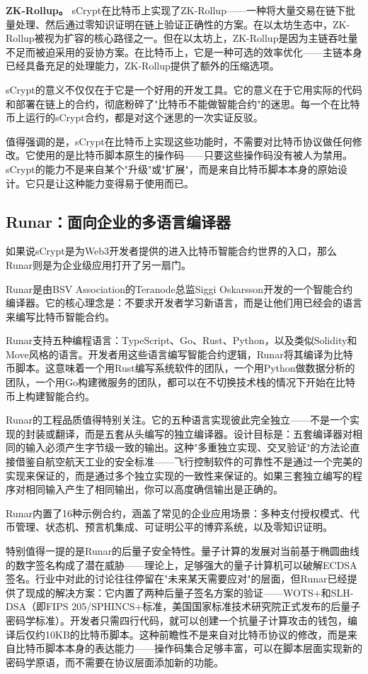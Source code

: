 \documentclass[a4paper,12pt,openany]{ctexbook}
\begin{document}
\textbf{ZK-Rollup。} sCrypt在比特币上实现了ZK-Rollup——一种将大量交易在链下批量处理、然后通过零知识证明在链上验证正确性的方案。在以太坊生态中，ZK-Rollup被视为扩容的核心路径之一。但在以太坊上，ZK-Rollup是因为主链吞吐量不足而被迫采用的妥协方案。在比特币上，它是一种可选的效率优化——主链本身已经具备充足的处理能力，ZK-Rollup提供了额外的压缩选项。

sCrypt的意义不仅仅在于它是一个好用的开发工具。它的意义在于它用实际的代码和部署在链上的合约，彻底粉碎了"比特币不能做智能合约"的迷思。每一个在比特币上运行的sCrypt合约，都是对这个迷思的一次实证反驳。

值得强调的是，sCrypt在比特币上实现这些功能时，不需要对比特币协议做任何修改。它使用的是比特币脚本原生的操作码——只要这些操作码没有被人为禁用。sCrypt的能力不是来自某个"升级"或"扩展"，而是来自比特币脚本本身的原始设计。它只是让这种能力变得易于使用而已。


\subsection*{Runar：面向企业的多语言编译器}


如果说sCrypt是为Web3开发者提供的进入比特币智能合约世界的入口，那么Runar则是为企业级应用打开了另一扇门。

Runar是由BSV Association的Teranode总监Siggi Oskarsson开发的一个智能合约编译器。它的核心理念是：不要求开发者学习新语言，而是让他们用已经会的语言来编写比特币智能合约。

Runar支持五种编程语言：TypeScript、Go、Rust、Python，以及类似Solidity和Move风格的语言。开发者用这些语言编写智能合约逻辑，Runar将其编译为比特币脚本。这意味着一个用Rust编写系统软件的团队，一个用Python做数据分析的团队，一个用Go构建微服务的团队，都可以在不切换技术栈的情况下开始在比特币上构建智能合约。

Runar的工程品质值得特别关注。它的五种语言实现彼此完全独立——不是一个实现的封装或翻译，而是五套从头编写的独立编译器。设计目标是：五套编译器对相同的输入必须产生字节级一致的输出。这种"多重独立实现、交叉验证"的方法论直接借鉴自航空航天工业的安全标准——飞行控制软件的可靠性不是通过一个完美的实现来保证的，而是通过多个独立实现的一致性来保证的。如果三套独立编写的程序对相同输入产生了相同输出，你可以高度确信输出是正确的。

Runar内置了16种示例合约，涵盖了常见的企业应用场景：多种支付授权模式、代币管理、状态机、预言机集成、可证明公平的博弈系统，以及零知识证明。

特别值得一提的是Runar的后量子安全特性。量子计算的发展对当前基于椭圆曲线的数字签名构成了潜在威胁——理论上，足够强大的量子计算机可以破解ECDSA签名。行业中对此的讨论往往停留在"未来某天需要应对"的层面，但Runar已经提供了现成的解决方案：它内置了两种后量子签名方案的验证——WOTS+和SLH-DSA（即FIPS 205/SPHINCS+标准，美国国家标准技术研究院正式发布的后量子密码学标准）。开发者只需四行代码，就可以创建一个抗量子计算攻击的钱包，编译后仅约10KB的比特币脚本。这种前瞻性不是来自对比特币协议的修改，而是来自比特币脚本本身的表达能力——操作码集合足够丰富，可以在脚本层面实现新的密码学原语，而不需要在协议层面添加新的功能。
\end{document}
